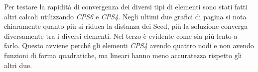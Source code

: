 Per testare la rapidità di convergenza dei diversi tipi di elementi sono stati fatti altri calcoli utilizzando \emph{CPS6} e \emph{CPS4}. 
Negli ultimi due grafici di pagina \pageref{GraficoConfrontocps6} si nota chiaramente quanto più si riduca la distanza dei Seed, più la soluzione converga diversamente tra i diversi elementi. 
Nel terzo è evidente come sia più lento a farlo.
Questo avviene perché gli elementi \emph{CPS4} avendo quattro nodi e non avendo funzioni di forma quadratiche, ma lineari hanno meno accuratezza rispetto gli altri due.
%
\begin{figure}[p]
\centering
{} \\

\end{figure}
